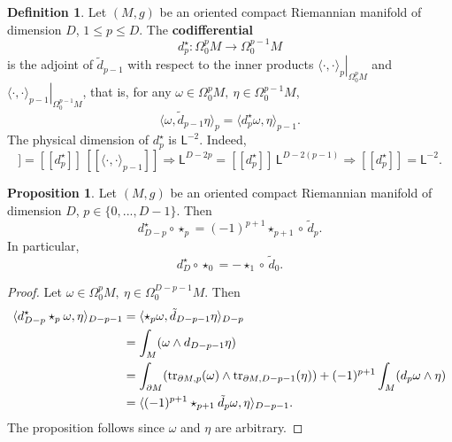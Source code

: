 \documentclass{elsarticle}
\theoremstyle{definition}
\newtheorem{proposition}[theorem]{Proposition}
\newtheorem{definition}[theorem]{Definition}
\newcommand{\inner}[2]{\langle#1,#2\rangle}
\newcommand{\tr}{\mathop{\rm tr}\nolimits}
\newcommand{\restrict}[2]{\left.#1\right|_{#2}}
\newcommand{\newterm}[1]{\textbf{#1}}
\newcommand{\length}{\mathsf{L}}
\begin{document}
\begin{definition}
  Let $(M, g)$ be an oriented compact Riemannian manifold of dimension $D$,
  $1 \leq p \leq D$.
  The \newterm{codifferential}
  \begin{equation}
    d^\star_p \colon \Omega^p_0 M \to \Omega^{p - 1}_0 M
  \end{equation}
  is the adjoint of $\tilde{d}_{p - 1}$ with respect to the inner products $\restrict{\inner{\cdot}{\cdot}_p}{\Omega^p_0 M}$ and $\restrict{\inner{\cdot}{\cdot}_{p - 1}}{\Omega^{p - 1}_0 M}$,
  that is, for any $\omega \in \Omega^p_0 M,\ \eta \in \Omega^{p - 1}_0 M$,
  \begin{equation}
    \inner{\omega}{\tilde{d}_{p - 1} \eta}_p = \inner{d^\star_p \omega}{\eta}_{p - 1}.
  \end{equation}
  The physical dimension of $d^\star_p$ is $\length^{-2}$.
  Indeed,
  \begin{equation}
    [[\inner{\cdot}{\cdot}_p]] = [[d^\star_p]] \, [[\inner{\cdot}{\cdot}_{p - 1}]]
    \Rightarrow \length^{D - 2 p} = [[d^\star_p]] \, \length^{D - 2 (p - 1)}
    \Rightarrow [[d^\star_p]] = \length^{-2}.
  \end{equation}
\end{definition}
\begin{proposition}
  Let $(M, g)$ be an oriented compact Riemannian manifold of dimension $D$, $p \in \{0, ..., D - 1\}$.
  Then
  \begin{equation}
    \label{eq:exterior_calculus/codifferential_formula}
    d^\star_{D - p} \circ \star_p
    = (-1)^{p + 1} \star_{p + 1} \circ\, \tilde{d}_p.
  \end{equation}
  In particular,
  \begin{equation}
    d^\star_D \circ \star_0 = - \star_1 \circ\, \tilde{d}_0.
  \end{equation}
\end{proposition}
\begin{proof}
  Let $\omega \in \Omega^p_0 M,\ \eta \in \Omega^{D - p - 1}_0 M$.
  Then
  \begin{equation}
    \label{eq:exterior_calculus/codifferential_formula_proof}
    \begin{split}
      \inner{d^\star_{D - p} \star_p \omega}{\eta}_{D - p - 1}
      & = \inner{\star_p \omega}{\tilde{d}_{D - p - 1} \eta}_{D - p} \\
      & = \int_M (\omega \wedge d_{D - p - 1} \eta) \\
      & = \int_{\partial M} (\tr_{\partial M, p}(\omega) \wedge \tr_{\partial M, D - p - 1}(\eta)) + (-1)^{p + 1} \int_{M} (d_p \omega \wedge \eta) \\
      & = \inner{(-1)^{p + 1} \star_{p + 1} \tilde{d}_p \omega}{\eta}_{D - p - 1}.
    \end{split}
  \end{equation}
  The proposition follows since $\omega$ and $\eta$ are arbitrary.
\end{proof}
\end{document}
